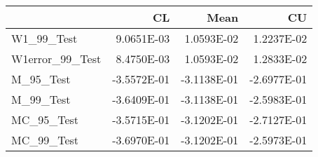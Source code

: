 \begin{tabular}{lrrr}
\toprule
{} &          CL &        Mean &          CU \\
\midrule
W1\_99\_Test      &  9.0651E-03 &  1.0593E-02 &  1.2237E-02 \\
W1error\_99\_Test &  8.4750E-03 &  1.0593E-02 &  1.2833E-02 \\
M\_95\_Test       & -3.5572E-01 & -3.1138E-01 & -2.6977E-01 \\
M\_99\_Test       & -3.6409E-01 & -3.1138E-01 & -2.5983E-01 \\
MC\_95\_Test      & -3.5715E-01 & -3.1202E-01 & -2.7127E-01 \\
MC\_99\_Test      & -3.6970E-01 & -3.1202E-01 & -2.5973E-01 \\
\bottomrule
\end{tabular}
